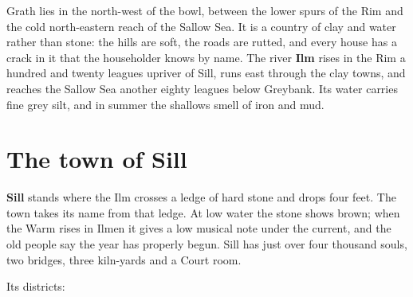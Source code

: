 \documentclass{design/chronicle}
\begin{document}
Grath lies in the north-west of the bowl, between the lower spurs of the Rim and the cold north-eastern reach of the Sallow Sea. It is a country of clay and water rather than stone: the hills are soft, the roads are rutted, and every house has a crack in it that the householder knows by name. The river \textbf{Ilm} rises in the Rim a hundred and twenty leagues upriver of Sill, runs east through the clay towns, and reaches the Sallow Sea another eighty leagues below Greybank. Its water carries fine grey silt, and in summer the shallows smell of iron and mud.

\section*{The town of Sill}

\textbf{Sill} stands where the Ilm crosses a ledge of hard stone and drops four feet. The town takes its name from that ledge. At low water the stone shows brown; when the Warm rises in Ilmen it gives a low musical note under the current, and the old people say the year has properly begun. Sill has just over four thousand souls, two bridges, three kiln-yards and a Court room.

Its districts:
\end{document}
